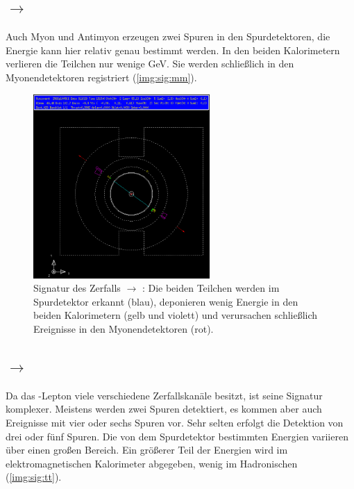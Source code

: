 \subsection*{\Z $\to$ \mm}
Auch Myon und Antimyon erzeugen zwei Spuren in den Spurdetektoren,
die Energie kann hier relativ genau bestimmt werden.
In den beiden Kalorimetern verlieren die Teilchen nur wenige GeV.
Sie werden schließlich in den Myonendetektoren registriert (\autoref{img:sig:mm}).

\begin{figure}[H]
\begin{center}
  \includegraphics[width=0.6\textwidth]{../img/gropepics/mm1b.png}
  \caption{Signatur des Zerfalls \Z $\to$ \mm: Die beiden Teilchen werden im Spurdetektor erkannt (blau),
  deponieren wenig Energie in den beiden Kalorimetern (gelb und violett) und verursachen schließlich Ereignisse
  in den Myonendetektoren (rot).}
  \label{img:sig:mm}
\end{center}
\end{figure} 

\subsection*{\Z $\to$ \tt}
Da das \texttau-Lepton viele verschiedene Zerfallskanäle besitzt,
ist seine Signatur komplexer.
Meistens werden zwei Spuren detektiert,
es kommen aber auch Ereignisse mit vier oder sechs Spuren vor.
Sehr selten erfolgt die Detektion von drei oder fünf Spuren.
Die von dem Spurdetektor bestimmten Energien variieren über einen großen Bereich.
Ein größerer Teil der Energien wird im elektromagnetischen Kalorimeter abgegeben,
wenig im Hadronischen (\autoref{img:sig:tt}).

